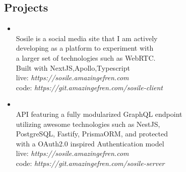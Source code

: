 \documentclass[10pt,oneside,a4paper,titlepage]{article}
\begin{document}
\begin{tcolorbox}
\begin{minipage}[t]{10cm}
\begin{tcolorbox}[grow to right by=1cm,colframe=white,colback=white]
      \section*{Projects}
      \vspace{-0.2cm}
      \begin{itemize}
        \item{
            {{}}
            \vspace{0.1cm}\\
             Sosile is a social media site that I am actively \\
             developing as a platform to experiment with\\
             a larger set of technologies such as WebRTC.\\
             Built with {{NextJS}},{{Apollo}},{{Typescript}}\\
             \small{live: \emph{\textcolor{themeBase}{https://sosile.amazingefren.com}}}\\
             \small{code: \emph{\textcolor{themeBase}{https://git.amazingefren.com/sosile-client}}}
          }
        \item{
            {{}}
            \vspace{0.1cm}\\
            API featuring a fully modularized {{GraphQL}} endpoint\\
            utilizing awesome technologies such as {{NestJS}},\\
            {{PostgreSQL}}, {{Fastify}}, {{PrismaORM}}, and protected\\
            with a {{OAuth2.0}} inspired Authentication model\\
           \small{live: \emph{\textcolor{themeBase}{https://sosile.amazingefren.com}}}\\
           \small{code: \emph{\textcolor{themeBase}{https://git.amazingefren.com/sosile-server}}}
          }
      \end{itemize}

      \vspace{-0.6cm}

\end{tcolorbox}
\end{minipage}
\end{tcolorbox}
\end{document}
